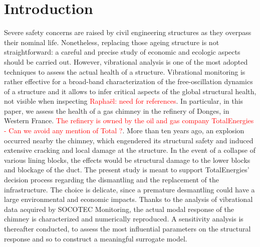 \documentclass[runningheads]{llncs}
\begin{document}
\section{Introduction}
\label{sec:Introduction}
Severe safety concerns are raised by civil engineering structures as they overpass their nominal life. Nonetheless, replacing those ageing structure is not straightforward: a careful and precise study of economic and ecologic aspects should be carried out. However, vibrational analysis is one of the most adopted techniques to assess the actual health of a structure. Vibrational monitoring is rather effective for a broad-band characterization of the free-oscillation dynamics of a structure and it allows to infer critical aspects of the global structural health, not visible when inspecting \textcolor{red}{Raphaël: need for references}. In particular, in this paper, we assess the health of a gas chimney in the refinery of Donges, in Western France. \textcolor{red}{The refinery is owned by the oil and gas company TotalEnergies - Can we avoid any mention of Total ?}. More than ten years ago, an explosion occurred nearby the chimney, which engendered its structural safety and induced extensive cracking and local damage at the structure. In the event of a collapse of various lining blocks, the effects would be structural damage to the lower blocks and blockage of the duct. %
The present study is meant to support TotalEnergies' decision process regarding the dismantling and the replacement of the infrastructure. The choice is delicate, since a premature desmantling could have a large environmental and economic impacts. Thanks to the analysis of vibrational data acquired by SOCOTEC Monitoring, the actual modal response of the chimney is characterized and numerically reproduced. A sensitivity analysis is thereafter conducted, to assess the most influential parameters on the structural response and so to construct a meaningful surrogate model.
\end{document}
